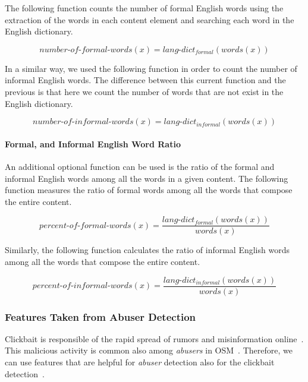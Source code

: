 \documentclass{sig-alternate}
\begin{document}
The following function counts the number of formal English words using the extraction of the words in each content element and searching each word in the English dictionary. 

\[
number\text{-}of\text{-}formal\text{-}words(x) = lang\text{-}dict_{formal}(words(x))
\]

In a similar way, we used the following function in order to count the number of informal English words.
The difference between this current function and the previous is that here we count the number of words that are not exist in the English dictionary.

\[
number\text{-}of\text{-}informal\text{-}words(x) = lang\text{-}dict_{informal}(words(x))
\]


\paragraph{Formal, and Informal English Word Ratio} 
\label{sec:formal_and_informal_word_ratio}
An additional optional function can be used is the ratio of the formal and informal English words among all the words in a given content.
The following function measures the ratio of formal words among all the words that compose the entire content. 
 
\[
percent\text{-}of\text{-}formal\text{-}words(x) = \frac{lang\text{-}dict_{formal}(words(x))}{words(x)}
\]

Similarly, the following function calculates the ratio of informal English words among all the words that compose the entire content.

\[
percent\text{-}of\text{-}informal\text{-}words(x) = \frac{lang\text{-}dict_{informal}(words(x))}{words(x)}
\]

\subsubsection{Features Taken from Abuser Detection}
\label{sec:features_taken_from_abuser_detection}
Clickbait is responsible of the rapid spread of rumors and misinformation online~\cite{chen2015misleading}. 
This malicious activity is common also among \emph{abusers} in OSM~\cite{elyashar2017measurement}. 
Therefore, we can use features that are helpful for \emph{abuser} detection also for the clickbait detection~\cite{potthast2016clickbait}.

\end{document}
